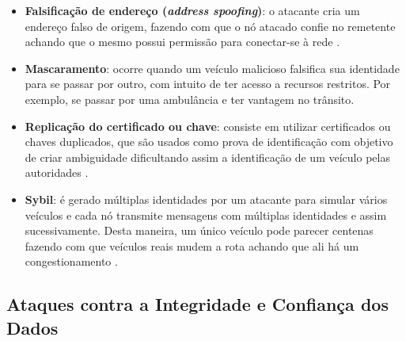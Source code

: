 \documentclass[
	12pt,				%
	oneside,			%
	a4paper,			%
	english,			%
	brazil				%
	]{abntex2ppgsi}
\begin{document}
\begin{itemize}
	\item {\textbf{Falsificação de endereço (\textit{address spoofing})}: o atacante cria um endereço falso de origem, fazendo com que o nó atacado confie no remetente achando que o mesmo possui permissão para conectar-se à rede \cite{al2012survey}.}
	
	\item {\textbf{Mascaramento}: ocorre quando um veículo malicioso falsifica sua identidade  para se passar por outro, com intuito de ter acesso a recursos restritos. Por exemplo, se passar por uma ambulância e ter vantagem no trânsito.}
	
	\item {\textbf{Replicação do certificado ou chave}: consiste em utilizar certificados ou chaves duplicados, que são usados como prova de identificação com objetivo de criar ambiguidade dificultando assim a identificação de um veículo pelas autoridades \cite{mejri2014survey}.}
	
	\item {\textbf{Sybil}: é gerado múltiplas identidades por um atacante para simular vários veículos e cada nó transmite mensagens com múltiplas identidades e assim sucessivamente. Desta maneira, um único veículo pode parecer centenas fazendo com que veículos reais mudem a rota achando que ali há um congestionamento \cite{tangade2013survey}.}
\end{itemize}

\subsection{Ataques contra a Integridade e Confiança dos Dados}
\end{document}

